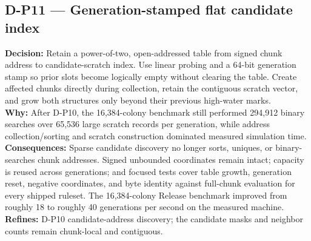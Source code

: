 \subsection*{D-P11 --- Generation-stamped flat candidate index}
\begin{decisionbox}[title={D-P11 \quad 2026-08-08}]
\textbf{Decision:} Retain a power-of-two, open-addressed table from signed
chunk address to candidate-scratch index. Use linear probing and a 64-bit
generation stamp so prior slots become logically empty without clearing the
table. Create affected chunks directly during collection, retain the contiguous
scratch vector, and grow both structures only beyond their previous high-water
marks.\\
\textbf{Why:} After D-P10, the 16,384-colony benchmark still performed 294,912
binary searches over 65,536 large scratch records per generation, while address
collection/sorting and scratch construction dominated measured simulation time.\\
\textbf{Consequences:} Sparse candidate discovery no longer sorts, uniques, or
binary-searches chunk addresses. Signed unbounded coordinates remain intact;
capacity is reused across generations; and focused tests cover table growth,
generation reset, negative coordinates, and byte identity against full-chunk
evaluation for every shipped ruleset. The 16,384-colony Release benchmark
improved from roughly 18 to roughly 40 generations per second on the measured
machine.\\
\textbf{Refines:} D-P10 candidate-address discovery; the candidate masks and
neighbor counts remain chunk-local and contiguous.
\end{decisionbox}

